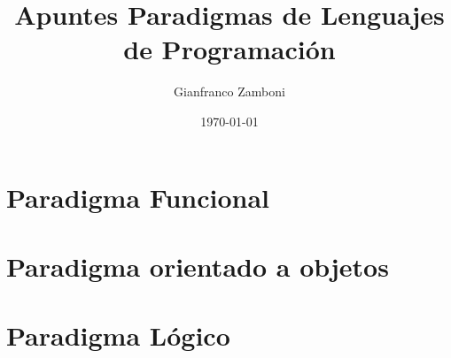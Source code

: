 \documentclass[10pt,a4paper]{article}
\begin{document}
\title{Apuntes Paradigmas de Lenguajes de Programación}

\date{\today}

\author{Gianfranco Zamboni}
\begin{titlepage}
    \maketitle
    \thispagestyle{empty}
    \tableofcontents
\end{titlepage}

\newpage
\setcounter{page}{1}


\newpage
\part{Paradigma Funcional}



\newpage


\newpage


\newpage


\newpage
\part{Paradigma orientado a objetos}


\newpage


\newpage


\newpage
\part{Paradigma Lógico}



\newpage


\newpage

\appendix
\newpage

\end{document}
